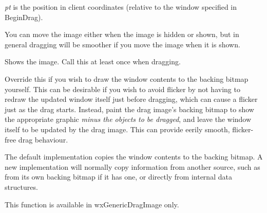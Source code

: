 {\it pt} is the position in client coordinates (relative to the window specified in BeginDrag).

You can move the image either when the image is hidden or shown, but in general dragging
will be smoother if you move the image when it is shown.

\label{wxdragimageshow}


Shows the image. Call this at least once when dragging.

\label{wxdragimageupdatebackingfromwindow}


Override this if you wish to draw the window contents to the backing bitmap
yourself. This can be desirable if you wish to avoid flicker by not having to
redraw the updated window itself just before dragging, which can cause a flicker just
as the drag starts. Instead, paint the drag image's backing bitmap to show the appropriate
graphic {\it minus the objects to be dragged}, and leave the window itself to be updated
by the drag image. This can provide eerily smooth, flicker-free drag behaviour.

The default implementation copies the window contents to the backing bitmap. A new
implementation will normally copy information from another source, such as from its
own backing bitmap if it has one, or directly from internal data structures.

This function is available in wxGenericDragImage only.

